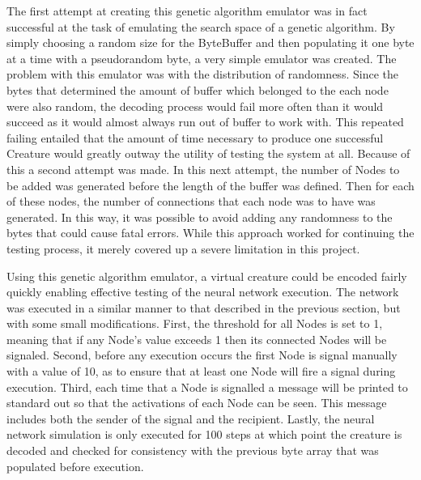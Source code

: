 \documentclass[12pt]{article}
\begin{document}
The first attempt at creating this genetic algorithm emulator was in fact successful at the task of emulating the search space of a genetic algorithm.
By simply choosing a random size for the ByteBuffer and then populating it one byte at a time with a pseudorandom byte, a very simple emulator was created.
The problem with this emulator was with the distribution of randomness.
Since the bytes that determined the amount of buffer which belonged to the each node were also random, the decoding process would fail more often than it would succeed as it would almost always run out of buffer to work with.
This repeated failing entailed that the amount of time necessary to produce one successful Creature would greatly outway the utility of testing the system at all.
Because of this a second attempt was made.
In this next attempt, the number of Nodes to be added was generated before the length of the buffer was defined.
Then for each of these nodes, the number of connections that each node was to have was generated.
In this way, it was possible to avoid adding any randomness to the bytes that could cause fatal errors.
While this approach worked for continuing the testing process, it merely covered up a severe limitation in this project.

Using this genetic algorithm emulator, a virtual creature could be encoded fairly quickly enabling effective testing of the neural network execution.
The network was executed in a similar manner to that described in the previous section, but with some small modifications.
First, the threshold for all Nodes is set to 1, meaning that if any Node’s value exceeds 1 then its connected Nodes will be signaled.
Second, before any execution occurs the first Node is signal manually with a value of 10, as to ensure that at least one Node will fire a signal during execution.
Third, each time that a Node is signalled a message will be printed to standard out so that the activations of each Node can be seen.
This message includes both the sender of the signal and the recipient.
Lastly, the neural network simulation is only executed for 100 steps at which point the creature is decoded and checked for consistency with the previous byte array that was populated before execution.
\end{document}
